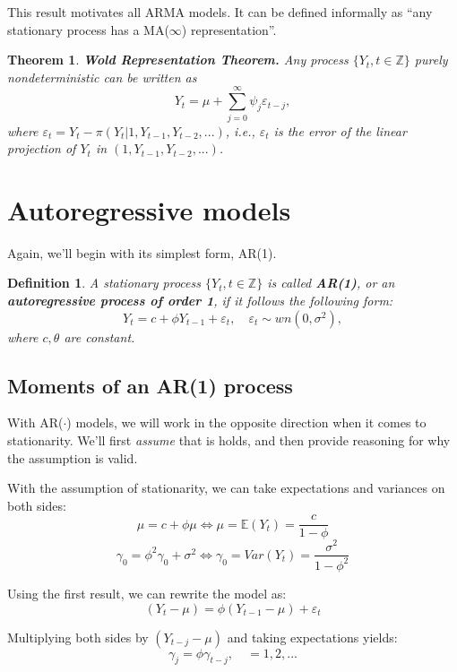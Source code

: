 \documentclass[11pt, a4paper]{report}
\theoremstyle{plain}
\newtheorem{thm}{Theorem}[section]
\theoremstyle{plain}
\newtheorem{defn}{Definition}[section]
\theoremstyle{remark}
\begin{document}
This result motivates all ARMA models. It can be defined informally as ``any stationary process has a MA($\infty$) representation''.

\begin{thm}{\textbf{Wold Representation Theorem.}}
	Any process $\{Y_t, t \in \mathbb{Z} \}$ purely nondeterministic can be written as
	$$ Y_t = \mu + \sum_{j=0}^{\infty} \psi_j \varepsilon_{t-j}, $$
	where $\varepsilon_{t} = Y_t - \pi(Y_t | 1, Y_{t-1}, Y_{t-2}, ...)$, i.e., $\varepsilon_{t}$ is the \textit{error of the linear projection of $Y_t$ in $(1, Y_{t-1}, Y_{t-2}, ...)$}.
\end{thm}

\section{Autoregressive models}

Again, we'll begin with its simplest form, AR(1).

\begin{defn}
	A stationary process $\{Y_t, t \in \mathbb{Z} \}$ is called \textbf{AR(1)}, or an \textbf{autoregressive process of order 1}, if it follows the following form:
	$$ Y_t = c + \phi Y_{t-1} + \varepsilon_t, \hspace{1em} \varepsilon_t \sim wn(0, \sigma^2), $$
	where $c, \theta$ are constant.
\end{defn}

\subsection{Moments of an AR(1) process}

With AR($\cdot$) models, we will work in the opposite direction when it comes to stationarity. We'll first \textit{assume} that is holds, and then provide reasoning for why the assumption is valid.

With the assumption of stationarity, we can take expectations and variances on both sides:
$$ \mu = c + \phi \mu \iff \mu = \mathbb{E}(Y_t) = \dfrac{c}{1 - \phi} $$
$$ \gamma_{0} = \phi^2 \gamma_{0} + \sigma^2 \iff \gamma_{0} = Var(Y_t) = \dfrac{\sigma^2}{1 - \phi^2} $$

Using the first result, we can rewrite the model as:
$$ (Y_t - \mu) = \phi (Y_{t-1} - \mu) + \varepsilon_{t} $$

Multiplying both sides by $(Y_{t-j} - \mu)$ and taking expectations yields:
$$ \gamma_{j} = \phi \gamma_{t-j}, \hspace{1em} = 1,2,... $$
\end{document}
